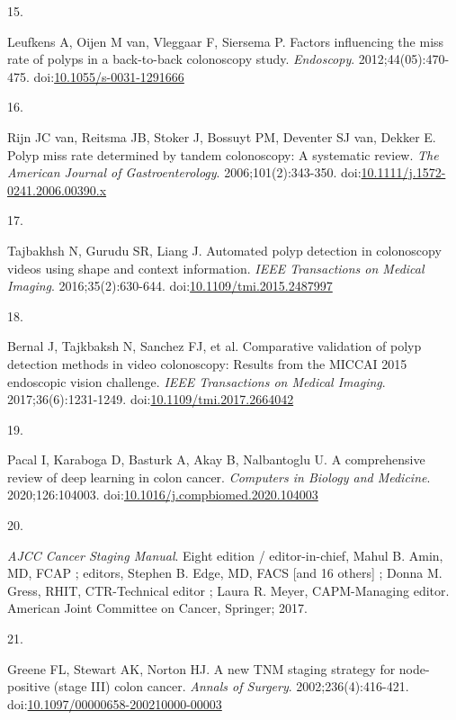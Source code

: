 \documentclass[11pt]{umnthesis}
\newlength{\csllabelwidth}
\newlength{\cslhangindent}
\newenvironment{CSLReferences}[2] %
 {%
  \setlength{\parindent}{0pt}
  \ifodd #1 \everypar{\setlength{\hangindent}{\cslhangindent}}\ignorespaces\fi
  \ifnum #2 > 0
  \setlength{\parskip}{#2\baselineskip}
  \fi
 }%
 {}
\newcommand{\CSLLeftMargin}[1]{\parbox[t]{\csllabelwidth}{#1}}
\newcommand{\CSLRightInline}[1]{\parbox[t]{\linewidth - \csllabelwidth}{#1}}
\begin{document}
\begin{CSLReferences}{0}{0}
\leavevmode{}%
\CSLLeftMargin{15. }
\CSLRightInline{Leufkens A, Oijen M van, Vleggaar F, Siersema P. Factors influencing the miss rate of polyps in a back-to-back colonoscopy study. \emph{Endoscopy}. 2012;44(05):470-475. doi:\href{https://doi.org/10.1055/s-0031-1291666}{10.1055/s-0031-1291666}}

\leavevmode{}%
\CSLLeftMargin{16. }
\CSLRightInline{Rijn JC van, Reitsma JB, Stoker J, Bossuyt PM, Deventer SJ van, Dekker E. Polyp miss rate determined by tandem colonoscopy: A systematic review. \emph{The American Journal of Gastroenterology}. 2006;101(2):343-350. doi:\href{https://doi.org/10.1111/j.1572-0241.2006.00390.x}{10.1111/j.1572-0241.2006.00390.x}}

\leavevmode{}%
\CSLLeftMargin{17. }
\CSLRightInline{Tajbakhsh N, Gurudu SR, Liang J. Automated polyp detection in colonoscopy videos using shape and context information. \emph{{IEEE} Transactions on Medical Imaging}. 2016;35(2):630-644. doi:\href{https://doi.org/10.1109/tmi.2015.2487997}{10.1109/tmi.2015.2487997}}

\leavevmode{}%
\CSLLeftMargin{18. }
\CSLRightInline{Bernal J, Tajkbaksh N, Sanchez FJ, et al. Comparative validation of polyp detection methods in video colonoscopy: Results from the {MICCAI} 2015 endoscopic vision challenge. \emph{{IEEE} Transactions on Medical Imaging}. 2017;36(6):1231-1249. doi:\href{https://doi.org/10.1109/tmi.2017.2664042}{10.1109/tmi.2017.2664042}}

\leavevmode{}%
\CSLLeftMargin{19. }
\CSLRightInline{Pacal I, Karaboga D, Basturk A, Akay B, Nalbantoglu U. A comprehensive review of deep learning in colon cancer. \emph{Computers in Biology and Medicine}. 2020;126:104003. doi:\href{https://doi.org/10.1016/j.compbiomed.2020.104003}{10.1016/j.compbiomed.2020.104003}}

\leavevmode{}%
\CSLLeftMargin{20. }
\CSLRightInline{\emph{AJCC Cancer Staging Manual}. Eight edition / editor-in-chief, Mahul B. Amin, MD, FCAP ; editors, Stephen B. Edge, MD, FACS {[}and 16 others{]} ; Donna M. Gress, RHIT, CTR-Technical editor ; Laura R. Meyer, CAPM-Managing editor. American Joint Committee on Cancer, Springer; 2017.}

\leavevmode{}%
\CSLLeftMargin{21. }
\CSLRightInline{Greene FL, Stewart AK, Norton HJ. A new {TNM} staging strategy for node-positive (stage {III}) colon cancer. \emph{Annals of Surgery}. 2002;236(4):416-421. doi:\href{https://doi.org/10.1097/00000658-200210000-00003}{10.1097/00000658-200210000-00003}}


\end{CSLReferences}
\end{document}
